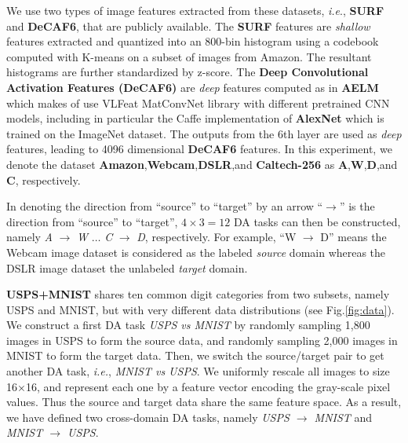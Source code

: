 \documentclass[journal,twocolumn]{IEEEtran}
\begin{document}
\begin{CJK*}{UTF8}{gkai}
We use two types of image features extracted from these datasets, \textit{i.e}.,   \textbf{SURF} and \textbf{DeCAF6}, that are publicly available.  The \textbf{SURF}\cite{gong2012geodesic} features are \textit{shallow} features extracted and quantized into an 800-bin histogram using a codebook computed with K-means on a subset of images from  Amazon. The resultant histograms are further standardized by z-score. The \textbf{Deep Convolutional Activation Features (DeCAF6)}\cite{DBLP:conf/icml/DonahueJVHZTD14} are \textit{deep} features computed as in \textbf{AELM}\cite{DBLP:journals/tcyb/UzairM17} which makes of use VLFeat MatConvNet library with different pretrained CNN models, including in particular  the Caffe implementation of \textbf{AlexNet}\cite{krizhevsky2012imagenet} which is trained on the ImageNet dataset. The outputs from the 6th layer are used as \textit{deep} features, leading to 4096 dimensional \textbf{DeCAF6} features. In this experiment, we denote the dataset \textbf{Amazon},\textbf{Webcam},\textbf{DSLR},and \textbf{Caltech-256} as \textbf{A},\textbf{W},\textbf{D},and \textbf{C}, respectively. 

In denoting the direction from “source” to “target”  by an arrow “$\rightarrow$” is the direction from “source” to “target”, $4\times 3=12$ DA tasks can then be constructed, namely \emph{A} $\rightarrow$ \emph{W} $\dots$ \emph{C} $\rightarrow$ \emph{D}, respectively. For example, “W $\rightarrow$ D” means the Webcam image dataset is considered as the labeled \textit{source} domain whereas the DSLR image dataset the unlabeled \textit{target} domain. 
% 
% 





\textbf{USPS+MNIST} shares ten common digit categories from two subsets, namely USPS and MNIST, but with very different data distributions (see Fig.\ref{fig:data}). We construct a first DA task \emph{USPS vs MNIST} by randomly sampling 1,800 images in USPS to form the source data, and randomly sampling 2,000 images in MNIST to form the target data. Then, we switch the source/target pair to get another DA task, \textit{i.e.}, \emph{MNIST vs USPS}. We uniformly rescale all images to size 16×16, and represent each one by a feature vector encoding the gray-scale pixel values. Thus the source and target data share the same feature space. As a result, we have defined two cross-domain DA tasks, namely \emph{USPS $\rightarrow$ MNIST} and \emph{MNIST $\rightarrow$ USPS}.


\end{CJK*}
\end{document}
